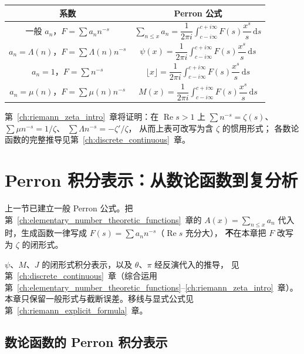 \begin{center}
\renewcommand{\arraystretch}{1.5}
\begin{tabular}{|c|c|}
\hline
\textbf{系数} & \textbf{Perron 公式} \\
\hline
一般 $a_n$，$F=\sum a_n n^{-s}$ &
$\displaystyle\sum_{n\le x}a_n
=\dfrac{1}{2\pi i}\int_{c-i\infty}^{c+i\infty}F(s)\dfrac{x^s}{s}\,\mathrm{d}s$ \\
\hline
$a_n=\Lambda(n)$，$F=\sum\Lambda(n)n^{-s}$ &
$\displaystyle\psi(x)
=\dfrac{1}{2\pi i}\int_{c-i\infty}^{c+i\infty}F(s)\dfrac{x^s}{s}\,\mathrm{d}s$ \\
\hline
$a_n=1$，$F=\sum n^{-s}$ &
$\displaystyle\lfloor x\rfloor
=\dfrac{1}{2\pi i}\int_{c-i\infty}^{c+i\infty}F(s)\dfrac{x^s}{s}\,\mathrm{d}s$ \\
\hline
$a_n=\mu(n)$，$F=\sum\mu(n)n^{-s}$ &
$\displaystyle M(x)
=\dfrac{1}{2\pi i}\int_{c-i\infty}^{c+i\infty}F(s)\dfrac{x^s}{s}\,\mathrm{d}s$ \\
\hline
\end{tabular}
\end{center}

第~\ref{ch:riemann_zeta_intro}~章将证明：在 $\operatorname{Re}s>1$ 上
$\sum n^{-s}=\zeta(s)$、$\sum\mu n^{-s}=1/\zeta$、
$\sum\Lambda n^{-s}=-\zeta'/\zeta$，
从而上表可改写为含 $\zeta$ 的惯用形式；
各数论函数的完整推导见第~\ref{ch:discrete_continuous}~章。

\section{Perron 积分表示：从数论函数到复分析}\label{sec:perron_integral_representation}

上一节已建立一般 Perron 公式。把第~\ref{ch:elementary_number_theoretic_functions}~章的
$A(x)=\sum_{n\le x}a_n$ 代入时，生成函数一律写成
$F(s)=\sum a_n n^{-s}$（$\operatorname{Re}s$ 充分大），
\textbf{不}在本章把 $F$ 改写为 $\zeta$ 的闭形式。

$\psi$、$M$、$J$ 的闭形式积分表示，以及 $\theta$、$\pi$ 经反演代入的推导，
见第~\ref{ch:discrete_continuous}~章（综合运用第~\ref{ch:elementary_number_theoretic_functions}--\ref{ch:riemann_zeta_intro}~章）。
本章只保留一般形式与截断误差。移线与显式公式见第~\ref{ch:riemann_explicit_formula}~章。

\subsection{数论函数的 Perron 积分表示}\label{subsec:perron_nt_summary}

